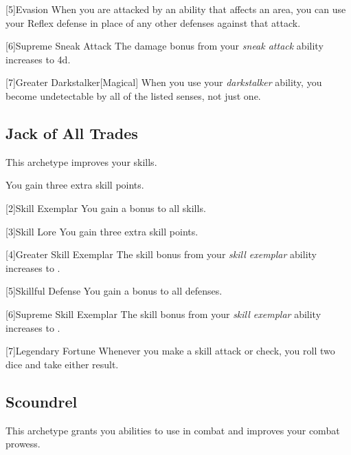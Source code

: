         [5]{Evasion} When you are attacked by an ability that affects an area, you can use your Reflex defense in place of any other defenses against that attack.

        [6]{Supreme Sneak Attack} The damage bonus from your \textit{sneak attack} ability increases to \plus4d.

        [7]{Greater Darkstalker}[Magical] When you use your \textit{darkstalker} ability, you become undetectable by all of the listed senses, not just one.

    \subsection{Jack of All Trades}
        This archetype improves your skills.

         You gain three extra skill points.

        [2]{Skill Exemplar} You gain a  bonus to all skills.

        [3]{Skill Lore} You gain three extra skill points.

        [4]{Greater Skill Exemplar} The skill bonus from your \textit{skill exemplar} ability increases to .

        [5]{Skillful Defense} You gain a  bonus to all defenses.

        [6]{Supreme Skill Exemplar} The skill bonus from your \textit{skill exemplar} ability increases to .

        [7]{Legendary Fortune} Whenever you make a skill attack or check, you roll two dice and take either result.

    \subsection{Scoundrel}
        This archetype grants you abilities to use in combat and improves your combat prowess.

